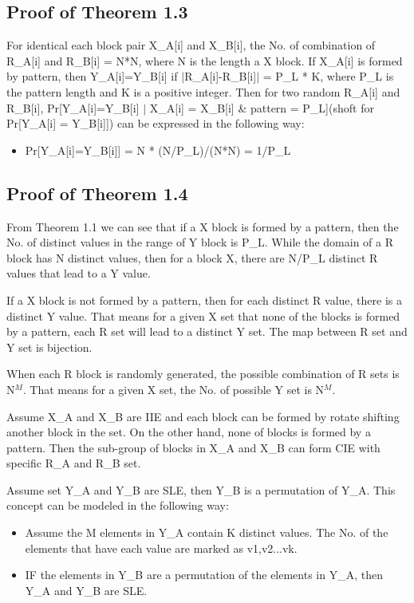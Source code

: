 \documentclass{article}
\begin{document}
\subsection{Proof of Theorem 1.3}
For identical each block pair X\_A[i] and X\_B[i], the No. of combination of R\_A[i] and R\_B[i] = N*N, where N is the length a X block. 
If X\_A[i] is formed by pattern, then Y\_A[i]=Y\_B[i] if $\mid$R\_A[i]-R\_B[i]$\mid$ = P\_L * K, where P\_L is the pattern length and K is a positive integer. 
Then for two random R\_A[i] and R\_B[i], Pr[Y\_A[i]=Y\_B[i] $\mid$ X\_A[i] = X\_B[i] \& pattern = P\_L](shoft for Pr[Y\_A[i] = Y\_B[i]]) can be expressed in the following way:
\begin{itemize}
	\item Pr[Y\_A[i]=Y\_B[i]] = N * (N/P\_L)/(N*N) = 1/P\_L
\end{itemize} 

\subsection{Proof of Theorem 1.4}
From Theorem 1.1 we can see that if a X block is formed by a pattern, then the No. of distinct values in the range of Y block is P\_L. While the domain of a R block has N distinct values, then for a block X, there are N/P\_L distinct R values that lead to a Y value.

If a X block is not formed by a pattern, then for each distinct R value, there is a distinct Y value. That means for a given X set that none of the blocks is formed by a pattern, each R set will lead to a distinct Y set. The map between R set and Y set is bijection.

When each R block is randomly generated, the possible combination of R sets is N$^M$. That means for a given X set, the No. of possible Y set is N$^M$.

Assume X\_A and X\_B are IIE and each block can be formed by rotate shifting another block in the set. On the other hand, none of blocks is formed by a pattern. Then the sub-group of blocks in X\_A and X\_B can form CIE with specific R\_A and R\_B set. 

Assume set Y\_A and Y\_B are SLE, then Y\_B is a permutation of Y\_A. This concept can be modeled in the following way:
\begin{itemize}
	\item Assume the M elements in Y\_A contain K distinct values. The No. of the elements that have each value are marked as v1,v2...vk.
	\item IF the elements in Y\_B are a permutation of the elements in Y\_A, then Y\_A and Y\_B are SLE.
\end{itemize}
\end{document}
